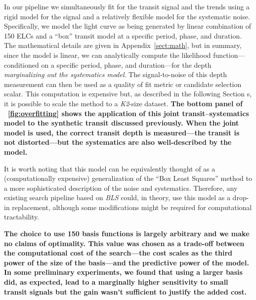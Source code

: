 \documentclass[12pt,preprint]{aastex}
\newcommand{\project}[1]{\textsl{#1}} %
\newcommand{\KT}{\project{K2}}
\newcommand{\figref}[1]{\ref{fig:#1}}
\newcommand{\Fig}[1]{\figurename~\figref{#1}}
\newcommand{\sectionname}{Section}
\newcommand{\App}[1]{Appendix~\ref{sect:#1}}
\newcommand{\app}[1]{\App{#1}}
\newcommand{\response}[1]{{\color{mygreen} {\bf #1}}}
\begin{document}
In our pipeline we simultaneously fit for the transit signal and the trends
using a rigid model for the signal and a relatively flexible model for the
systematic noise.
Specifically, we model the light curve as being generated by linear
combination of 150 ELCs and a ``box'' transit model at a specific period,
phase, and duration.
The mathematical details are given in \app{math}, but in summary, since the
model is linear, we can analytically compute the likelihood
function---conditioned on a specific period, phase, and duration---for the
depth \emph{marginalizing out the systematics model}.
The signal-to-noise of this depth measurement can then be used as a quality of
fit metric or candidate selection scalar.
This computation is expensive but, as described in the following \sectionname
s, it is possible to scale the method to a \KT-size dataset.
\response{The bottom panel of \Fig{overfitting} shows the application of this
joint transit--systematics model to the synthetic transit discussed
previously.
When the joint model is used, the correct transit depth is measured---the
transit is not distorted---but the systematics are also well-described by the
model.}

It is worth noting that this model can be equivalently thought of as a
(computationally expensive) generalization of the ``Box Least Squares''
\citep[\project{BLS};][]{Kovacs:2002} method to a more sophisticated
description of the noise and systematics.
Therefore, any existing search pipeline based on \project{BLS} could, in
theory, use this model as a drop-in replacement, although some modifications
might be required for computational tractability.

\response{%
The choice to use 150 basis functions is largely arbitrary and we make no
claims of optimality.
This value was chosen as a trade-off between the computational cost of the
search---the cost scales as the third power of the size of the basis---and the
predictive power of the model.
In some preliminary experiments, we found that using a larger basis did, as
expected, lead to a marginally higher sensitivity to small transit signals
but the gain wasn't sufficient to justify the added cost.
}
\end{document}
